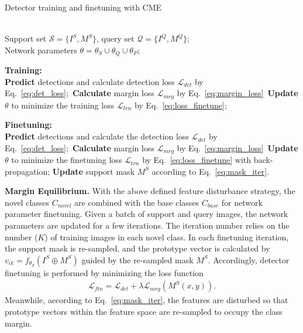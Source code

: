 \documentclass[final]{cvpr}
\begin{document}
\begin{algorithm}[t]
\label{alg:onlineEM}
\caption{Detector training and finetuning with CME}
\renewcommand{\algorithmicrequire}{\textbf{Input:}}  
\renewcommand{\algorithmicensure}{\textbf{Output:}}  
\begin{algorithmic}
\REQUIRE ~~\\ Support set $\mathcal{S}=\{I^S, M^S\}$, query set $\mathcal{Q}=\{I^Q, M^Q\}$;
\ENSURE ~~\\ Network parameters $\theta = \theta_S \cup \theta_Q \cup \theta_P$;

\textbf{Training:}\\
\STATE \textbf{Predict} detections and calculate detection loss $\mathcal{L}_{det}$ by Eq.\ \ref{eq:det_loss};\
\STATE \textbf{Calculate} margin loss $\mathcal{L}_{mrg}$ by Eq.\ \ref{eq:margin_loss}\
\STATE \textbf{Update} $\theta$ to minimize the training loss $\mathcal{L}_{trn}$ by Eq.\ \ref{eq:loss_finetune};
\ENDFOR

\textbf{Finetuning:}\\
\FOR{(iteration}
\STATE \textbf{Predict} detections and calculate the detection loss $\mathcal{L}_{det}$ by Eq.~\ref{eq:det_loss};\
\STATE \textbf{Calculate} margin loss $\mathcal{L}_{mrg}$ by Eq.\ \ref{eq:margin_loss}\
\STATE \textbf{Update} $\theta$ to minimize the finetuning loss $\mathcal{L}_{trn}$ by Eq.\ \ref{eq:loss_finetune} with back-propagation;
\STATE \textbf{Update} support mask $M^S$ according to Eq.\ \ref{eq:mask_iter}.\
\ENDFOR
\ENDFOR

\end{algorithmic}
\end{algorithm}




\textbf{Margin Equilibrium.}
With the above defined feature disturbance strategy, the novel classes $C_{novel}$ are combined with the base classes $C_{base}$ for network parameter finetuning.  Given a batch of support and query images, the network parameters are updated for a few iterations. The iteration number relies on the number ($K$) of training images in each novel class. In each finetuning iteration, the support mask is re-sampled, and the prototype vector is calculated by $v_{ik} = f_{\theta_S}(I^S\oplus M^{S})$ guided by the re-sampled mask $M^{S}$. Accordingly, detector finetuning is performed by minimizing the loss function
\begin{align}
   \mathcal{L}_{ftn} = \mathcal{L}_{det} + \lambda \mathcal{L}_{mrg}(M^S(x,y)).
   \label{eq:loss_finetune}
\end{align}
Meanwhile, according to Eq.~\ref{eq:mask_iter}, the features are disturbed so that prototype vectors within the feature space are re-sampled to occupy the class margin. 
\end{document}
